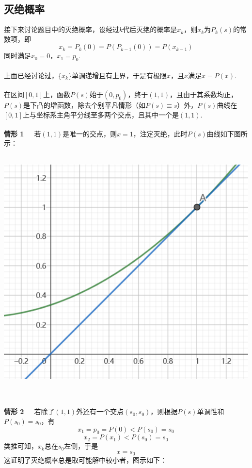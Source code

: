 \documentclass{article}
\begin{document}
\begin{CJK}{UTF8}{gbsn}
\section{灭绝概率}
接下来讨论题目中的灭绝概率，设经过$k$代后灭绝的概率是$x_k$，则$x_k$为$P_k(s)$的常数项，即
$$ x_k=P_k(0)=P(P_{k-1}(0))=P(x_{k-1}) $$
同时满足$x_0=0$，$x_1=p_0$.
\\\\
上面已经讨论过，$\{x_k\}$单调递增且有上界，于是有极限$x$，且$x$满足$x=P(x)$.
\\\\
在区间$[0,1]$上，函数$P(s)$始于$(0,p_0)$，终于$(1,1)$，且由于其系数均正，$P(s)$是下凸的增函数，除去个别平凡情形（如$P(s)\equiv s$）外，$P(s)$曲线在$[0,1]$上与坐标系主角平分线至多两个交点，且其中一个是$(1,1)$.
\\\\
\textbf{情形 1}\ \ \ 若$(1,1)$是唯一的交点，则$x=1$，注定灭绝，此时$P(s)$曲线如下图所示：\\\\
\begin{minipage}{0.5\textwidth}
    \includegraphics[scale=0.7]{case1.png}
\end{minipage}
\\\\
\textbf{情形 2}\ \ \ 若除了$(1,1)$外还有一个交点$(s_0,s_0)$，则根据$P(s)$单调性和$P(s_0)=s_0$，有
$$ x_1=p_0=P(0)<P(s_0)=s_0 $$
$$ x_2=P(x_1)<P(s_0)=s_0 $$
类推可知，$x_k$总在$s_0$左侧，于是
$$ x=s_0 $$
这证明了灭绝概率总是取可能解中较小者，图示如下：\\\\

\end{CJK}
\end{document}
